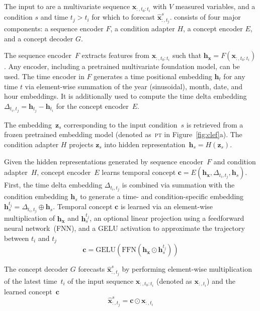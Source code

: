 

The input to \name are a multivariate sequence $\mathbf{x}_{:,t_0:t_i}$ with $V$ measured variables, and a condition $s$ and time $t_j > t_i$ for which to forecast $\hat{\mathbf{x}}^s_{:,t_j}$. \name consists of four major components: a sequence encoder $F$, a condition adapter $H$, a concept encoder $E$, and a concept decoder $G$.

\label{sec:seq_enc}
%
The sequence encoder~$F$ extracts features from $\mathbf{x}_{:, t_0:t_i}$ such that $\mathbf{h}_\mathbf{x} = F(\mathbf{x}_{:,t_0:t_i})$. Any encoder, including a pretrained multivariate foundation model, can be used. The time encoder in $F$ generates a time positional embedding $\mathbf{h}_t$ for any time $t$ via element-wise summation of the year (sinusoidal), month, date, and hour embeddings. It is additionally used to compute the time delta embedding~$\Delta_{t_i,t_j} = \mathbf{h}_{t_j} - \mathbf{h}_{t_i}$ for the concept encoder~$E$. 


\label{sec:cond_adp}
%
The embedding~$\mathbf{z}_s$ corresponding to the input condition~$s$ is retrieved from a frozen pretrained embedding model (denoted as~\textsc{pt} in Figure~\ref{fig:clef}a). The condition adapter $H$ projects $\mathbf{z}_s$ into hidden representation~$\mathbf{h}_{s} = H(\mathbf{z}_s)$.

\label{sec:concept_enc}
%
Given the hidden representations generated by sequence encoder~$F$ and condition adapter~$H$, concept encoder~$E$ learns temporal concept $\mathbf{c} = E(\mathbf{h}_\mathbf{x}, \Delta_{t_i,t_j}, \mathbf{h}_s)$. First, the time delta embedding $\Delta_{t_i,t_j}$ is combined via summation with the condition embedding $\mathbf{h}_s$ to generate a time- and condition-specific embedding $\mathbf{h}_s^{t_j} = \Delta_{t_i,t_j} \oplus \mathbf{h}_s$. Temporal concept $\mathbf{c}$ is learned via an element-wise multiplication of $\mathbf{h}_\mathbf{x}$ and $\mathbf{h}_s^{t_j}$, an optional linear projection using a feedforward neural network~(FNN), and a GELU activation to approximate the trajectory between $t_i$ and $t_j$
\begin{equation}
    \mathbf{c} = \text{GELU}(\text{FFN}(\mathbf{h}_{\mathbf{x}} \odot \mathbf{h}_s^{t_j}))
\end{equation}





%
The concept decoder $G$ forecasts $\hat{\mathbf{x}}^s_{:,t_j}$ by performing element-wise multiplication of the latest time~$t_i$ of the input sequence $\mathbf{x}_{:,t_0:t_i}$ (denoted as $\mathbf{x}_{:,t_i}$) and the learned concept~$\mathbf{c}$
\begin{equation}
    \hat{\mathbf{x}}^s_{:,t_j} = \mathbf{c} \odot \mathbf{x}_{:,t_i} 
\end{equation}


